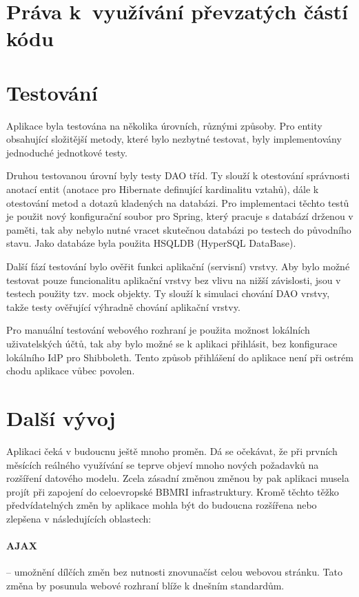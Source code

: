 \section{Práva k~využívání převzatých částí kódu}

\section{Testování}
Aplikace byla testována na několika úrovních, různými způsoby. Pro entity obsahující složitější metody, které bylo nezbytné testovat, byly implementovány jednoduché jednotkové testy. 

Druhou testovanou úrovní byly testy DAO tříd. Ty slouží k otestování správnosti anotací entit (anotace pro Hibernate definující kardinalitu vztahů), dále k otestování metod a dotazů kladených na databázi. Pro implementaci těchto testů je použit nový konfigurační soubor pro Spring, který pracuje s databází drženou v paměti, tak aby nebylo nutné vracet skutečnou databázi po testech do původního stavu. Jako databáze byla použita HSQLDB (HyperSQL DataBase).

Další fází testování bylo ověřit funkci aplikační (servisní) vrstvy. Aby bylo možné testovat pouze funcionalitu aplikační vrstvy bez vlivu na nižší závislosti, jsou v testech použity tzv. mock objekty. Ty slouží k simulaci chování DAO vrstvy, takže testy ověřující výhradně chování aplikační vrstvy.

Pro manuální testování webového rozhraní je použita možnost lokálních uživatelských účtů, tak aby bylo možné se k aplikaci přihlásit, bez konfigurace lokálního IdP pro Shibboleth. Tento způsob přihlášení do aplikace není při ostrém chodu aplikace vůbec povolen.

\section{Další vývoj}
Aplikaci čeká v budoucnu ještě mnoho proměn. Dá se očekávat, že při prvních měsících reálného využívání se teprve objeví mnoho nových požadavků na rozšíření datového modelu. Zcela zásadní změnou změnou by pak aplikaci musela projít při zapojení \ProjectName do celoevropské BBMRI infrastruktury. Kromě těchto těžko předvídatelných změn by aplikace mohla být do budoucna rozšířena nebo zlepšena v následujících oblastech:

\paragraph*{AJAX} -- umožnění dílčích změn bez nutnosti znovunačíst celou webovou stránku. Tato změna by posunula webové rozhraní blíže k dnešním standardům.
